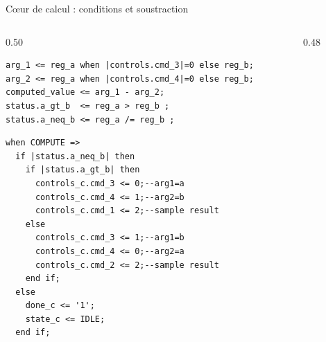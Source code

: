 \begin{frame}[fragile,t]{Cœur de calcul : conditions et soustraction}
\begin{columns}[T]
\begin{column}{0.50\textwidth}
\begin{lstlisting}
arg_1 <= reg_a when |controls.cmd_3|=0 else reg_b;
arg_2 <= reg_a when |controls.cmd_4|=0 else reg_b;
computed_value <= arg_1 - arg_2;
status.a_gt_b  <= reg_a > reg_b ;
status.a_neq_b <= reg_a /= reg_b ;
\end{lstlisting}
\vspace{1.5mm}
\begin{lstlisting}
when COMPUTE =>
  if |status.a_neq_b| then
    if |status.a_gt_b| then
      controls_c.cmd_3 <= 0;--arg1=a
      controls_c.cmd_4 <= 1;--arg2=b
      controls_c.cmd_1 <= 2;--sample result
    else
      controls_c.cmd_3 <= 1;--arg1=b
      controls_c.cmd_4 <= 0;--arg2=a
      controls_c.cmd_2 <= 2;--sample result
    end if;
  else
    done_c <= '1';
    state_c <= IDLE;
  end if;
\end{lstlisting}
\end{column}
\begin{column}{0.48\textwidth}
\end{column}
\end{columns}
\end{frame}

